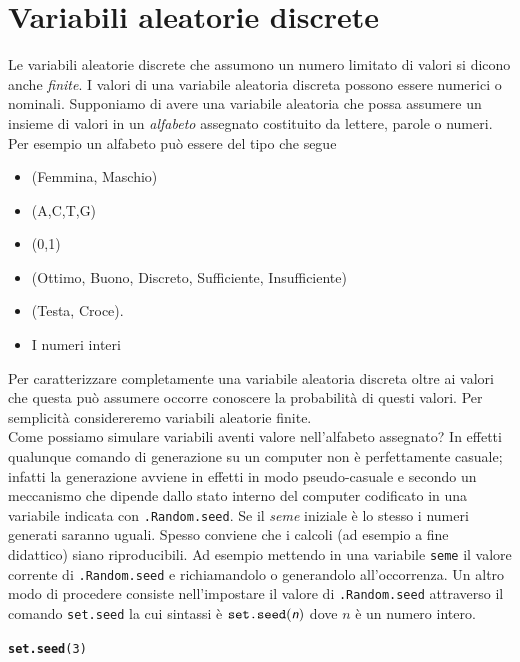 \documentclass[onecolumn,12pt]{book}\usepackage[]{graphicx}\usepackage[]{color}
\makeatletter
\newcommand{\hlnum}[1]{\textcolor[rgb]{0.686,0.059,0.569}{#1}}%
\newcommand{\hlstd}[1]{\textcolor[rgb]{0.345,0.345,0.345}{#1}}%
\newcommand{\hlkwd}[1]{\textcolor[rgb]{0.737,0.353,0.396}{\textbf{#1}}}%
\newenvironment{kframe}{%
 \def\at@end@of@kframe{}%
 \ifinner\ifhmode%
  \def\at@end@of@kframe{\end{minipage}}%
  \begin{minipage}{\columnwidth}%
 \fi\fi%
 \def\FrameCommand##1{\hskip\@totalleftmargin \hskip-\fboxsep
 \colorbox{shadecolor}{##1}\hskip-\fboxsep
     \hskip-\linewidth \hskip-\@totalleftmargin \hskip\columnwidth}%
 \MakeFramed {\advance\hsize-\width
   \@totalleftmargin\z@ \linewidth\hsize
   \@setminipage}}%
 {\par\unskip\endMakeFramed%
 \at@end@of@kframe}
\newenvironment{knitrout}{}{} %
\newcommand{\varia}[1]{\textsl{\textsf{#1}}}
\makeatother
\begin{document}
\section{Variabili aleatorie discrete}
Le variabili aleatorie  discrete che  assumono un numero limitato di valori si dicono anche \emph{finite}.  I valori di una variabile aleatoria discreta possono essere numerici o nominali.
 Supponiamo di avere una variabile aleatoria che possa assumere un insieme di valori in  un \emph{alfabeto} assegnato costituito da lettere, parole o numeri. Per esempio un alfabeto pu\`o essere del tipo che segue
\begin{itemize}
\item{}(Femmina, Maschio)
\item{}(A,C,T,G)
\item{} (0,1)
\item{}(Ottimo, Buono, Discreto, Sufficiente, Insufficiente)
\item{} (Testa, Croce).
\item{} I numeri interi
\end{itemize}
Per caratterizzare completamente una variabile aleatoria discreta oltre ai valori che questa pu\`o  assumere occorre conoscere la probabilit\`a  di questi valori.
Per semplicit\`a considereremo variabili aleatorie finite.\\
Come possiamo simulare variabili aventi valore nell'alfabeto assegnato?
In effetti qualunque comando di generazione su un computer non \`e perfettamente casuale; infatti la generazione avviene in effetti in modo pseudo-casuale e  secondo un meccanismo che dipende dallo stato interno del computer codificato in una variabile indicata con \texttt{.Random.seed}. Se il {\it seme} iniziale \`e lo stesso i numeri generati saranno uguali. Spesso conviene che i calcoli (ad esempio a fine didattico) siano riproducibili. Ad esempio mettendo in una variabile \texttt{seme} il valore corrente di \texttt{.Random.seed} e richiamandolo o generandolo all'occorrenza.  
Un altro modo di procedere consiste nell'impostare il valore di 
\texttt{.Random.seed} attraverso il comando 
\texttt{set.seed}  la cui sintassi \`e 
$\texttt{set.seed}(\varia{n})$ dove $n$ \`e un numero intero.
 
\begin{knitrout}
\color{fgcolor}\begin{kframe}
\begin{alltt}
\hlkwd{set.seed}\hlstd{(}\hlnum{3}\hlstd{)}
\end{alltt}
\end{kframe}
\end{knitrout}
 
\end{document}
